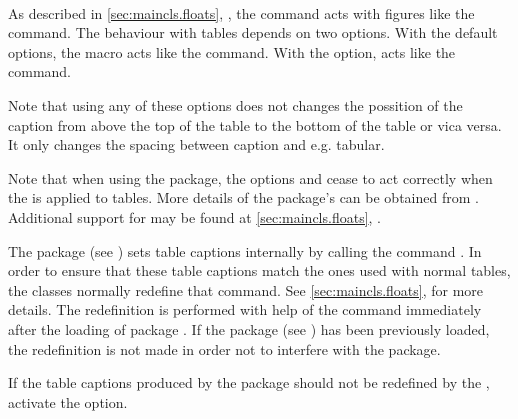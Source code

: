 \begin{Declaration}
  \\
\end{Declaration}%
%
%
As described in \autoref{sec:maincls.floats},
, the
 command acts with figures like the
 command. The behaviour with tables
depends on two options.  With the default  options,
the  macro acts like the  command. With the
 option,  acts like the
 command.

Note that using any of these options does not changes the possition of the
caption from above the top of the table to the bottom of the table or vica
versa. It only changes the spacing between caption and e.g. tabular.

Note that when using the
 package, the options  and
 cease to act correctly when the
 is applied to tables. More details of the 
package's  can be obtained from
\cite{package:float}. Additional support for  may be found at
\autoref{sec:maincls.floats}, .
%
%
%


\begin{Explain}%
\begin{Declaration}
\end{Declaration}%
%
The package
 (see \cite{package:longtable})
sets table captions internally by calling the command .
In order to ensure that these table captions match the ones used with normal
tables, the \KOMAScript{} classes normally redefine that command. See
\autoref{sec:maincls.floats},
 for more details. The
redefinition is performed with help of the command 
immediately after the loading of package .  If the package
 (see \cite{package:caption}) has
been previously loaded, the redefinition is not made in order not to interfere
with the  package.
\end{Explain}
If the table captions produced by the  package
should not be redefined by the \KOMAScript{}, activate the
 option.
%
%


